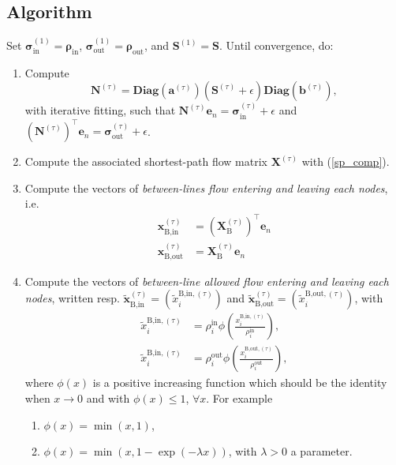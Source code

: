 \documentclass[11p]{article}
\begin{document}
\subsection{Algorithm}
Set $\bm{\sigma}^{(1)}_\text{in} = \bm{\rho}_\text{in}$, $\bm{\sigma}^{(1)}_\text{out} = \bm{\rho}_\text{out}$, and $\mathbf{S}^{(1)} = \mathbf{S}$. Until convergence, do:
\begin{enumerate}
	\item Compute 
	\begin{equation}
		\mathbf{N}^{(\tau)} = \textbf{Diag}(\mathbf{a}^{(\tau)}) (\mathbf{S}^{(\tau)} + \epsilon)\textbf{Diag}(\mathbf{b}^{(\tau)}),
	\end{equation}
	with iterative fitting, such that $\mathbf{N}^{(\tau)} \mathbf{e}_n = \bm{\sigma}^{(\tau)}_\text{in} + \epsilon$ and $\left(\mathbf{N}^{(\tau)}\right)^\top \mathbf{e}_n = \bm{\sigma}^{(\tau)}_\text{out}  + \epsilon$.
	
	\item Compute the associated shortest-path flow matrix $\mathbf{X}^{(\tau)}$ with (\ref{sp_comp}).
	
	\item Compute the vectors of \emph{between-lines flow entering and leaving each nodes}, i.e.
	\begin{align}
		\mathbf{x}^{(\tau)}_\text{B,in} &= (\mathbf{X}^{(\tau)}_\text{B})^\top \mathbf{e}_n \\
		\mathbf{x}^{(\tau)}_\text{B,out} &= \mathbf{X}^{(\tau)}_\text{B} \mathbf{e}_n
	\end{align}

	\item Compute the vectors of \emph{between-line allowed flow entering and leaving each nodes}, written resp. $\tilde{\mathbf{x}}^{(\tau)}_\text{B,in} = (\tilde{x}^{\text{B,in},(\tau)}_i)$ and $\tilde{\mathbf{x}}^{(\tau)}_\text{B,out} = (\tilde{x}^{\text{B,out},(\tau)}_i)$, with 
	\begin{align}
		\tilde{x}^{\text{B,in},(\tau)}_i &= \rho_i^\text{in} \phi \left( \frac{x^{\text{B,in},(\tau)}_i}{\rho_i^\text{in}} \right), \\
		\tilde{x}^{\text{B,in},(\tau)}_i &= \rho_i^\text{out} \phi \left( \frac{x^{\text{B,out},(\tau)}_i}{\rho_i^\text{out}} \right),
	\end{align}
	where $\phi(x)$ is a positive increasing function which should be the identity when $x \to 0$ and with $\phi(x) \leq 1$, $\forall x$. For example
	\begin{enumerate}
		\item $\phi(x) = \min(x, 1)$,
		\item $\phi(x) = \min(x, 1 - \exp(-\lambda x))$, with $\lambda > 0$ a parameter.
	\end{enumerate}


\end{enumerate}
\end{document}
